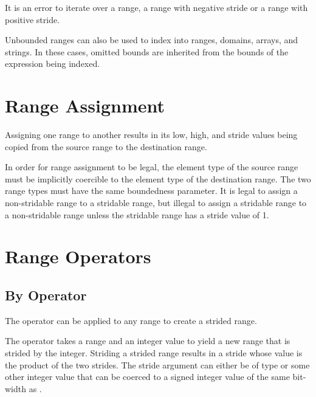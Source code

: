 It is an error to iterate over a  range,
a  range with negative stride or a
 range with positive stride.

Unbounded ranges can also be used to index into ranges, domains,
arrays, and strings.  In these cases, omitted bounds are inherited
from the bounds of the expression being indexed.


\section{Range Assignment}
\label{Range_Assignment}

Assigning one range to another results in its low, high, and stride
values being copied from the source range to the destination range.

In order for range assignment to be legal, the element type of the
source range must be implicitly coercible to the element type of the
destination range.  The two range types must have the same boundedness
parameter.  It is legal to assign a non-stridable range to a stridable
range, but illegal to assign a stridable range to a non-stridable
range unless the stridable range has a stride value of 1.


\section{Range Operators}
\label{Range_Operators}

\subsection{By Operator}
\label{By_Operator_For_Ranges}

The  operator can be applied to any range to create a strided
range.

The  operator takes a range and an integer value to yield a
new range that is strided by the integer.  Striding a strided range
results in a stride whose value is the product of the two strides.
The stride argument can either be of type  or some other
integer value that can be coerced to a signed integer value of the same
bit-width as .

